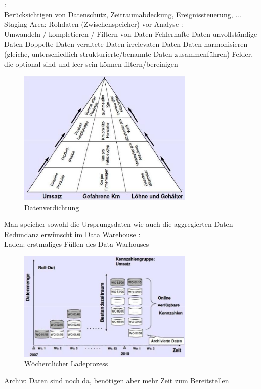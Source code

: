 \documentclass[ngerman,a4paper,12pt]{scrreprt}
\begin{document}
\dl
	:\\
		\ul		
			\li Berücksichtigen von Datenschutz, Zeitraumabdeckung, Ereignissteuerung, ...
			\li Staging Area: Rohdaten (Zwischenspeicher) vor Analyse
		\ulE
	:\\
		\ul
			\li Umwandeln / kompletieren / Filtern von Daten 
				\ul
					\li Fehlerhafte Daten
					\li unvollständige Daten
					\li Doppelte Daten
					\li veraltete Daten
					\li irrelevaten Daten
				\ulE	
			\li Daten harmonisieren (gleiche, unterschiedlich strukturierte/benannte Daten zusammenführen)			
			\li Felder, die optional sind und leer sein können filtern/bereinigen
				\begin{figure}[H]
					\centering
					\includegraphics[width=0.75\textwidth]{img/V6.6.jpg}
					\caption{Datenverdichtung}
					\label{}
				\end{figure}
			\li Man speicher sowohl die Ursprungsdaten wie auch die aggregierten Daten
			\li Redundanz erwünscht im Data Warehouse
		\ulE
	:\\
		\ul
			\li Laden: erstmaliges Füllen des Data Warhouses			
				\begin{figure}[H]
					\centering
					\includegraphics[width=0.75\textwidth]{img/V6.7.jpg}
					\caption{Wöchentlicher Ladeprozess}
					\label{}
				\end{figure}
			\li Archiv: Daten sind noch da, benötigen aber mehr Zeit zum Bereitstellen
			\li 
		\ulE
\dlE
			
\end{document}
